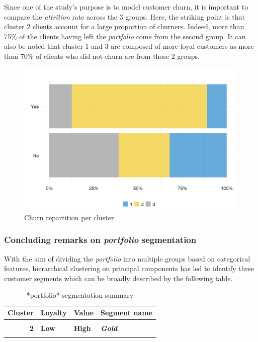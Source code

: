 \documentclass[
]{book}
\begin{document}
Since one of the study's purpose is to model customer churn, it is important to compare the \emph{attrition} rate across the 3 groups. Here, the striking point is that cluster 2 clients account for a large proportion of churners. Indeed, more than 75\% of the clients having left the \emph{portfolio} come from the second group. It can also be noted that cluster 1 and 3 are composed of more loyal customers as more than 70\% of clients who did not churn are from those 2 groups.

\begin{figure}

{\centering \includegraphics[width=0.6\linewidth,height=0.6\textheight]{./imgs/churn_cluster_barplot} 

}

\caption{Churn repartition per cluster}\label{fig:catvarsclust}
\end{figure}

\hypertarget{concluding-remarks-on-portfolio-segmentation}{%
\subsubsection*{\texorpdfstring{Concluding remarks on \emph{portfolio} segmentation}{Concluding remarks on portfolio segmentation}}\label{concluding-remarks-on-portfolio-segmentation}}

With the aim of dividing the \emph{portfolio} into multiple groups based on categorical features, hierarchical clustering on principal components has led to identify three customer segments which can be broadly described by the following table.

\begin{table}[H]

\caption{\label{tab:unnamed-chunk-25}*portfolio* segmentation summary}
\centering
\begin{tabular}[t]{rll>{}l}
\toprule
Cluster & Loyalty & Value & Segment name\\
\midrule
\cellcolor{gray!6}{1} & \cellcolor{gray!6}{High} & \cellcolor{gray!6}{Low} & \em{\cellcolor{gray!6}{Silver}}\\
\textbf{2} & \textbf{Low} & \textbf{High} & \textbf{\em{Gold}}\\
\cellcolor{gray!6}{3} & \cellcolor{gray!6}{High} & \cellcolor{gray!6}{High} & \em{\cellcolor{gray!6}{Platinum}}\\
\bottomrule
\end{tabular}
\end{table}
\end{document}
